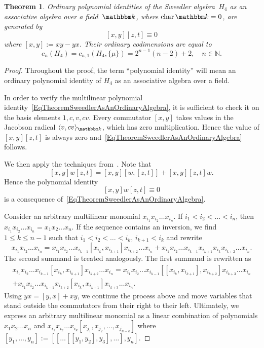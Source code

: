 \documentclass[12pt, reqno, a4paper]{amsart}
\theoremstyle{plain}
\newtheorem{theorem}{Theorem}[section]
\theoremstyle{remark}
\theoremstyle{definition}
\numberwithin{equation}{section}
\DeclareMathOperator{\ch}{char}
\begin{document}
\begin{theorem}\label{TheoremSweedlerAsAnOrdinaryAlgebra}
Ordinary polynomial identities of the Sweedler algebra~$H_4$
as an associative algebra over a field~$\mathbbm k$, where $\ch \mathbbm k = 0$, 
are generated by \begin{equation}\label{EqTheoremSweedlerAsAnOrdinaryAlgebra}[x,y][z,t]\equiv 0
\end{equation}
 where $[x,y]:=xy-yx$. Their ordinary codimensions are equal to
$$c_n(H_4)=c_{n,1}(H_4, \lbrace \mu \rbrace)=2^{n-1}(n-2)+2,\quad n \in\mathbb N.$$
\end{theorem}
\begin{proof} Throughout the proof, the term ``polynomial identity'' will mean an ordinary polynomial identity of $H_4$ as an associative algebra over a field.
	
	In order to verify the multilinear polynomial identity~\eqref{EqTheoremSweedlerAsAnOrdinaryAlgebra},
	it is sufficient to check it on the basis elements $1,c,v,cv$. Every commutator $[x,y]$ takes values
	in the Jacobson radical $\langle v,cv\rangle_{\mathbbm k}$, which has zero multiplication. Hence the value of $[x,y][z,t]$
	is always zero and~\eqref{EqTheoremSweedlerAsAnOrdinaryAlgebra} follows.
	
	 We then apply the techniques from~\cite[Theorem 4.1.5]{GiaZai}.	
	Note that $$[x,y]w[z,t]=[x,y][w,[z,t]]+[x,y][z,t]w.$$ Hence the polynomial
	identity \begin{equation}\label{EqTheoremSweedlerAsAnOrdinaryAlgebraConsequence}[x,y]w[z,t]\equiv 0\end{equation} is a consequence of~\eqref{EqTheoremSweedlerAsAnOrdinaryAlgebra}.
	
	Consider an arbitrary multilinear monomial $x_{i_1} x_{i_2}\ldots x_{i_n}$. If $i_1 < i_2 < \ldots < i_n$,
	then $x_{i_1} x_{i_2}\ldots x_{i_n} = x_1 x_2 \ldots x_n$.
	If the sequence contains an inversion, we find $1\leqslant k \leqslant n-1$
	such that $i_1 < i_2 < \ldots < i_k$, $i_{k+1} < i_k$ and rewrite
	$$x_{i_1} x_{i_2}\ldots x_{i_n} =  x_{i_1} x_{i_2}\ldots x_{i_{k-1}}[x_{i_k}, x_{i_{k+1}}]
	x_{i_{k+2}} \ldots x_{i_n} + x_{i_1} x_{i_2}\ldots x_{i_{k-1}} x_{i_{k+1}} x_{i_k}
	x_{i_{k+2}} \ldots x_{i_n}.
	$$ 
	The second summand is treated analogously. The first summand
	is rewritten as \begin{equation*}\begin{split}x_{i_1} x_{i_2}\ldots x_{i_{k-1}}[x_{i_k}, x_{i_{k+1}}]
	x_{i_{k+2}} \ldots x_{i_n} = x_{i_1} x_{i_2}\ldots x_{i_{k-1}}[[x_{i_k}, x_{i_{k+1}}], 
	x_{i_{k+2}}] x_{i_{k+3}} \ldots x_{i_n} \\
	+ x_{i_1} x_{i_2}\ldots x_{i_{k-1}} x_{i_{k+2}}[x_{i_k}, x_{i_{k+1}}]
	x_{i_{k+3}} \ldots x_{i_n}.\end{split}\end{equation*}
	Using $yx=[y,x]+xy$, we continue the process above and move variables that stand outside the commutators from their right to their left. Ultimately, we express an arbitrary multilinear monomial as a linear combination of
	polynomials $x_1 x_2 \ldots x_n$ and $x_{i_1} x_{i_2}\ldots x_{i_k}[x_{j_1}, x_{j_2}, \ldots, x_{j_{n-k}}]$
	where $[y_1, \ldots, y_n] := [[\ldots[[y_1, y_2],y_3], \ldots], y_n]$.
	

\end{proof}
\end{document}
